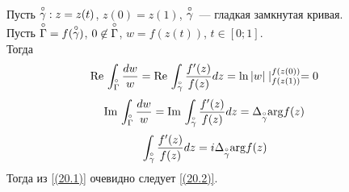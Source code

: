 \pr
Пусть $\overset{\circ}{\gamma}: z = z(t)$, $z(0) = z(1)$, $\overset{\circ}{\gamma}$~--- гладкая замкнутая кривая.
\\
Пусть $\overset{\circ}{\Gamma} = f(\overset{\circ}{\gamma})$, $0 \not \in \overset{\circ}{\Gamma}$, $w =
f(z(t))$, $t \in [0;1]$.
\\
Тогда
\begin{align*}
  & \mathrm{Re}\, \int_{\overset{\circ}{\Gamma}}\frac{dw}{w} = \mathrm{Re}\, \int_{\overset{\circ}{\gamma}}\frac{f'(z)}{f(z)}dz = \ln\left| w \right| \mid_{f(z(1))}^{f(z(0))} = 0
\end{align*}
\begin{align*}
  & \mathrm{Im}\, \int_{\overset{\circ}{\Gamma}}\frac{dw}{w} = \mathrm{Im}\, \int_{\overset{\circ}{\gamma}}\frac{f'(z)}{f(z)}dz = \Delta_{\overset{\circ}{\gamma}}\mathrm{arg} f(z)
\end{align*}
\begin{align*}
  & \int_{\overset{\circ}{\gamma}}\frac{f'(z)}{f(z)}dz = i \Delta_{\overset{\circ}{\gamma}}\mathrm{arg} f(z)
\end{align*}
Тогда из \eqref{(20.1)} очевидно следует \eqref{(20.2)}.